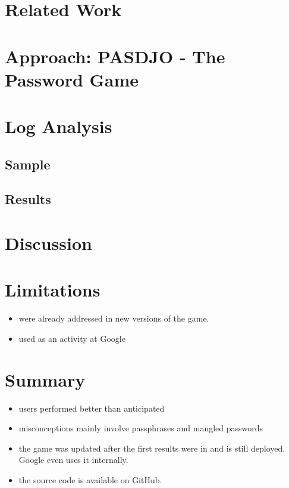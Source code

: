 \section{Related Work}

\section{Approach: PASDJO - The Password Game}


\section{Log Analysis}

\subsection{Sample}
\subsection{Results}


\section{Discussion}

\section{Limitations}
\begin{itemize}
	\item were already addressed in new versions of the game. 
	\item used as an activity at Google	
\end{itemize}


\section{Summary}
\begin{itemize}
	\item users performed better than anticipated
	\item misconceptions mainly involve passphrases and mangled passwords
	\item the game was updated after the first results were in and is still deployed. Google even uses it internally. 
	\item the source code is available on GitHub.
\end{itemize}